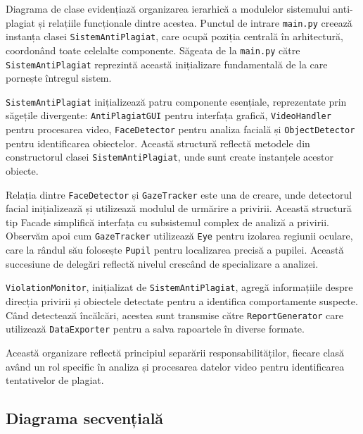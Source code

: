 \documentclass[12pt,a4paper]{article}
\begin{document}
Diagrama de clase evidențiază organizarea ierarhică a modulelor sistemului anti-plagiat și relațiile funcționale dintre acestea. Punctul de intrare \texttt{main.py} creează instanța clasei \texttt{SistemAntiPlagiat}, care ocupă poziția centrală în arhitectură, coordonând toate celelalte componente. Săgeata de la \texttt{main.py} către \texttt{SistemAntiPlagiat} reprezintă această inițializare fundamentală de la care pornește întregul sistem.

\texttt{SistemAntiPlagiat} inițializează patru componente esențiale, reprezentate prin săgețile divergente: \texttt{AntiPlagiatGUI} pentru interfața grafică, \texttt{VideoHandler} pentru procesarea video, \texttt{FaceDetector} pentru analiza facială și \texttt{ObjectDetector} pentru identificarea obiectelor. Această structură reflectă metodele din constructorul clasei \texttt{SistemAntiPlagiat}, unde sunt create instanțele acestor obiecte.

Relația dintre \texttt{FaceDetector} și \texttt{GazeTracker} este una de creare, unde detectorul facial inițializează și utilizează modulul de urmărire a privirii. Această structură tip Facade simplifică interfața cu subsistemul complex de analiză a privirii. Observăm apoi cum \texttt{GazeTracker} utilizează \texttt{Eye} pentru izolarea regiunii oculare, care la rândul său folosește \texttt{Pupil} pentru localizarea precisă a pupilei. Această succesiune de delegări reflectă nivelul crescând de specializare a analizei.

\texttt{ViolationMonitor}, inițializat de \texttt{SistemAntiPlagiat}, agregă informațiile despre direcția privirii și obiectele detectate pentru a identifica comportamente suspecte. Când detectează încălcări, acestea sunt transmise către \texttt{ReportGenerator} care utilizează \texttt{DataExporter} pentru a salva rapoartele în diverse formate.

Această organizare reflectă principiul separării responsabilităților, fiecare clasă având un rol specific în analiza și procesarea datelor video pentru identificarea tentativelor de plagiat.

\subsection{Diagrama secvențială}
\end{document}
